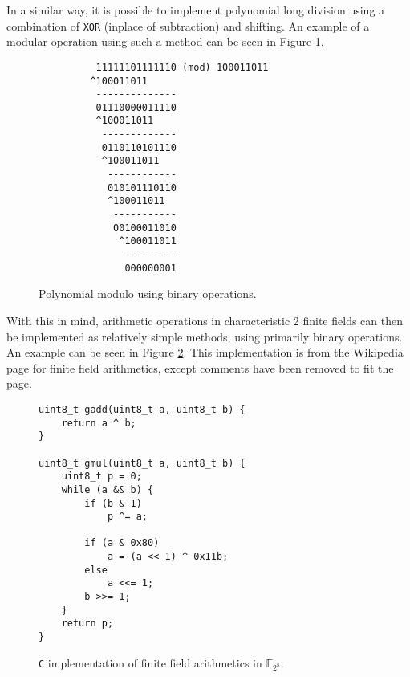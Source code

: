 In a similar way, it is possible to implement polynomial long division using a combination of \texttt{XOR} (inplace of subtraction) and shifting. An example of a modular operation\cite{finiteFieldArithmetics} using such a method can be seen in Figure \ref{longmod}.
\begin{figure}[!h]\small
\begin{verbatim} 
          11111101111110 (mod) 100011011
         ^100011011     
          --------------
          01110000011110
          ^100011011    
           -------------
           0110110101110
           ^100011011   
            ------------
            010101110110
            ^100011011  
             -----------
             00100011010
              ^100011011
               ---------  
               000000001
\end{verbatim}
\caption{Polynomial modulo using binary operations.} 
\label{longmod}
\end{figure}


With this in mind, arithmetic operations in characteristic 2 finite fields can then be implemented as relatively simple methods, using primarily binary operations. An example can be seen in Figure \ref{finitearithmetics}. This implementation is from the Wikipedia page for finite field arithmetics\cite{finiteFieldArithmetics}, except comments have been removed to fit the page. 
\begin{figure}\small
\begin{verbatim}
uint8_t gadd(uint8_t a, uint8_t b) {
    return a ^ b;
}

uint8_t gmul(uint8_t a, uint8_t b) {
    uint8_t p = 0;
    while (a && b) {
        if (b & 1) 
            p ^= a; 

        if (a & 0x80) 
            a = (a << 1) ^ 0x11b; 
        else
            a <<= 1; 
        b >>= 1; 
    }
    return p;
}
\end{verbatim}
\caption{\texttt{C} implementation of finite field arithmetics in $\mathbb{F}_{2^8}$.}
\label{finitearithmetics}
\end{figure}